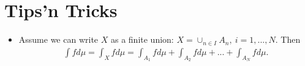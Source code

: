 \section*{Tips'n Tricks}
\begin{itemize}
    \item Assume we can write \(X\) as a finite union: \(X=\cup_{n\in I}A_n, \ i={1,...,N}\). Then
    \begin{align*}
        \int fd\mu = \int_X fd\mu = \int_{A_1}fd\mu + \int_{A_2}fd\mu + ... + \int_{A_N}fd\mu.
    \end{align*}
\end{itemize}